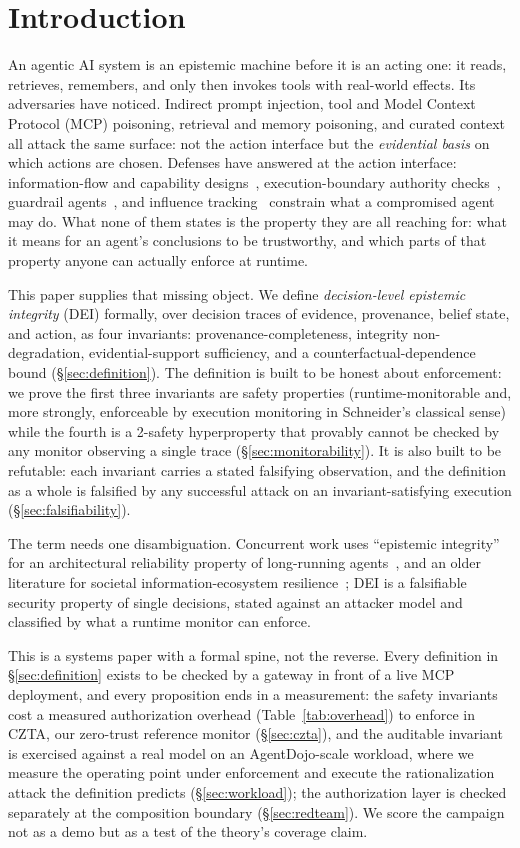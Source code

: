 \documentclass[conference]{IEEEtran}
\begin{document}
\section{Introduction}
An agentic AI system is an epistemic machine before it is an
acting one: it reads, retrieves, remembers, and only then invokes
tools with real-world effects. Its adversaries have noticed.
Indirect prompt injection, tool and Model Context Protocol (MCP)
poisoning, retrieval and memory poisoning, and curated context all
attack the same surface: not the action interface but the
\emph{evidential basis} on which actions are chosen. Defenses have
answered at the action interface: information-flow and capability
designs~\cite{camel}, execution-boundary authority checks~\cite{cxi},
guardrail agents~\cite{guardagent}, and influence tracking~\cite{argus}
constrain what a compromised agent may do. What none of them states
is the property they are all reaching for: what it means for an
agent's conclusions to be trustworthy, and which parts of that
property anyone can actually enforce at runtime.

This paper supplies that missing object. We define
\emph{decision-level epistemic integrity} (DEI) formally, over
decision traces of evidence, provenance, belief state, and action,
as four invariants: provenance-completeness, integrity
non-degradation, evidential-support sufficiency, and a
counterfactual-dependence bound (\S\ref{sec:definition}). The
definition is built to be honest about enforcement: we prove the
first three invariants are safety properties (runtime-monitorable
and, more strongly, enforceable by execution monitoring in
Schneider's classical sense) while the fourth is a 2-safety
hyperproperty that provably cannot be checked by any monitor
observing a single trace (\S\ref{sec:monitorability}). It is also
built to be refutable: each invariant carries a stated falsifying
observation, and the definition as a whole is falsified by any
successful attack on an invariant-satisfying execution
(\S\ref{sec:falsifiability}).

The term needs one disambiguation. Concurrent work uses ``epistemic
integrity'' for an architectural reliability property of
long-running agents~\cite{shen}, and an older literature for
societal information-ecosystem resilience~\cite{seger}; DEI is a
falsifiable security property of single decisions, stated against
an attacker model and classified by what a runtime monitor can
enforce.

This is a systems paper with a formal spine, not the reverse.
Every definition in \S\ref{sec:definition} exists to be checked by
a gateway in front of a live MCP deployment, and every proposition
ends in a measurement: the safety invariants cost a measured
authorization overhead (Table~\ref{tab:overhead}) to enforce in
CZTA, our zero-trust reference monitor (\S\ref{sec:czta}), and the
auditable invariant is exercised against a real model on an
AgentDojo-scale workload, where we measure the operating point
under enforcement and execute the rationalization attack the
definition predicts (\S\ref{sec:workload}); the authorization
layer is checked separately at the composition boundary
(\S\ref{sec:redteam}). We score the campaign not as a demo but as
a test of the theory's coverage claim.
\end{document}
